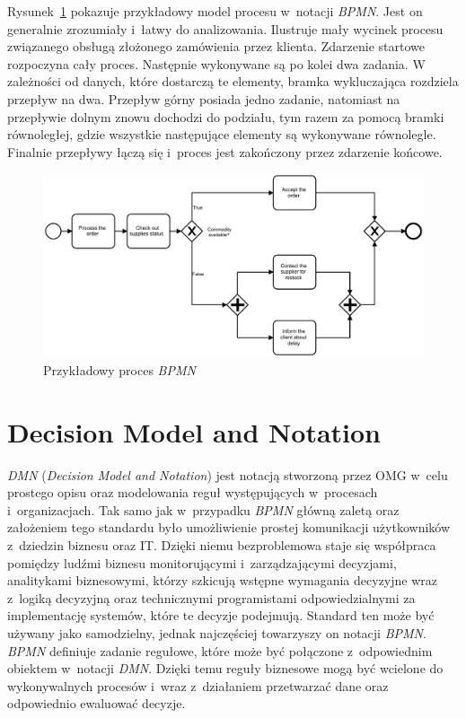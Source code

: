 Rysunek~\ref{fig:bpmnExample} pokazuje przykładowy model procesu w~notacji \emph{BPMN}. Jest on generalnie zrozumiały i~łatwy do analizowania. Ilustruje mały wycinek procesu związanego obsługą złożonego zamówienia przez klienta. Zdarzenie startowe rozpoczyna cały proces. Następnie wykonywane są po kolei dwa zadania. W zależności od danych, które dostarczą te elementy, bramka wykluczająca rozdziela przepływ na dwa. Przepływ górny posiada jedno zadanie, natomiast na przepływie dolnym znowu dochodzi do podziału, tym razem za pomocą bramki równoległej, gdzie wszystkie następujące elementy są wykonywane równolegle. Finalnie przepływy łączą się i~proces jest zakończony przez zdarzenie końcowe. 
\begin{figure}
    \centering
    \includegraphics[width=\textwidth]{./assets/processExample.pdf}
    \caption{Przykładowy proces \emph{BPMN}}
    \label{fig:bpmnExample}
\end{figure}

\section{Decision Model and Notation}
\label{sec:dmn}
\emph{DMN} (\emph{Decision Model and Notation}) jest notacją stworzoną przez OMG w~celu prostego opisu oraz modelowania reguł występujących w~procesach i~organizacjach. Tak samo jak w~przypadku \emph{BPMN} główną zaletą oraz założeniem tego standardu było umożliwienie prostej komunikacji użytkowników z~dziedzin biznesu oraz IT. Dzięki niemu bezproblemowa staje się współpraca pomiędzy ludźmi biznesu monitorującymi i~zarządzającymi decyzjami, analitykami biznesowymi, którzy szkicują wstępne wymagania decyzyjne wraz z~logiką decyzyjną oraz technicznymi programistami odpowiedzialnymi za implementację systemów, które te decyzje podejmują. Standard ten może być używany jako samodzielny, jednak najczęściej towarzyszy on notacji \emph{BPMN}. \emph{BPMN} definiuje zadanie regułowe, które może być połączone z~odpowiednim obiektem w~notacji \emph{DMN}. Dzięki temu reguły biznesowe mogą być wcielone do wykonywalnych procesów i~wraz z~działaniem przetwarzać dane oraz odpowiednio ewaluować decyzje.

